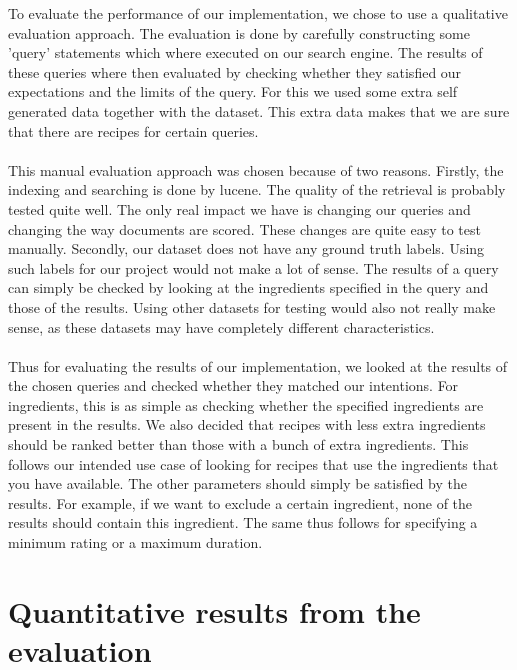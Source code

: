 \documentclass{article}
\begin{document}
To evaluate the performance of our implementation,
we chose to use a qualitative evaluation approach.
The evaluation is done by carefully constructing some 'query' statements
which where executed on our search engine.
The results of these queries where then evaluated by checking whether they
satisfied our expectations and the limits of the query.
For this we used some extra self generated data together with the dataset.
This extra data makes that we are sure that there are recipes for certain queries.
\\~\\
This manual evaluation approach was chosen because of two reasons.
Firstly, the indexing and searching is done by lucene.
The quality of the retrieval is probably tested quite well.
The only real impact we have is changing our queries and changing the way
documents are scored.
These changes are quite easy to test manually.
Secondly, our dataset does not have any ground truth labels.
Using such labels for our project would not make a lot of sense.
The results of a query can simply be checked by looking at the ingredients
specified in the query and those of the results.
Using other datasets for testing would also not really make sense,
as these datasets may have completely different characteristics.
\\~\\
Thus for evaluating the results of our implementation,
we looked at the results of the chosen queries and checked whether they
matched our intentions.
For ingredients, this is as simple as checking whether the specified
ingredients are present in the results.
We also decided that recipes with less extra ingredients should be ranked
better than those with a bunch of extra ingredients.
This follows our intended use case of looking for recipes that use the
ingredients that you have available.
The other parameters should simply be satisfied by the results.
For example, if we want to exclude a certain ingredient,
none of the results should contain this ingredient.
The same thus follows for specifying a minimum rating or a maximum duration.

\section{Quantitative results from the evaluation}
\end{document}
